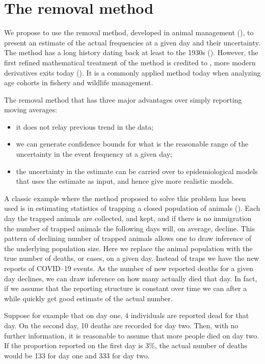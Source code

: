 \documentclass[a4paper,11pt,article,oneside,openany,american]{memoir}
\begin{document}
\chapter{The removal method}
We propose to use the removal method, developed in animal management (\cite{Pollock1991_review_papers}), to present an estimate of the actual frequencies at a given day and their uncertainty. The method has a long history dating back at least to the 1930s (\cite{Leslie1939_attempt_determine}). However, the first refined mathematical treatment of the method is credited to \cite{Moran1951_mathematical_theory}, more modern derivatives exits today (\cite{Matechou2016_open_models}). It is a commonly applied method today when analyzing age cohorts in fishery and wildlife management.

The removal method that has three major advantages over simply reporting moving averages:

\begin{itemize}
	\item it does not relay previous trend in the data;
	\item we can generate confidence bounds for what is the reasonable range of the uncertainty in the event frequency at a given day;
	\item the uncertainty in the estimate can be carried over to epidemiological models that uses the estimate as input, and hence give more realistic models.
\end{itemize}

A classic example where the method proposed to solve this problem has been used is in estimating statistics of trapping a closed population of animals (\cite{Pollock1991_review_papers}). Each day the trapped animals are collected, and kept, and if there is no immigration the number of trapped animals the following days will, on average, decline. This pattern of declining number of trapped animals allows one to draw inference of the underlying population size. Here we replace the animal population with the true number of deaths, or cases, on a given day. Instead of traps we have the new reports of COVID--19 events. As the number of new reported deaths for a given day declines, we can draw inference on how many actually died that day. In fact, if we assume that the reporting structure is constant over time we can after a while quickly get good estimate of the actual number.

Suppose for example that on day one, 4 individuals are reported dead for that day. On the second day, 10 deaths are recorded for day two. Then, with no further information, it is reasonable to assume that more people died on day two. If the proportion reported on the first day is 3\%, the actual number of deaths would be 133 for day one and 333 for day two.
\end{document}
